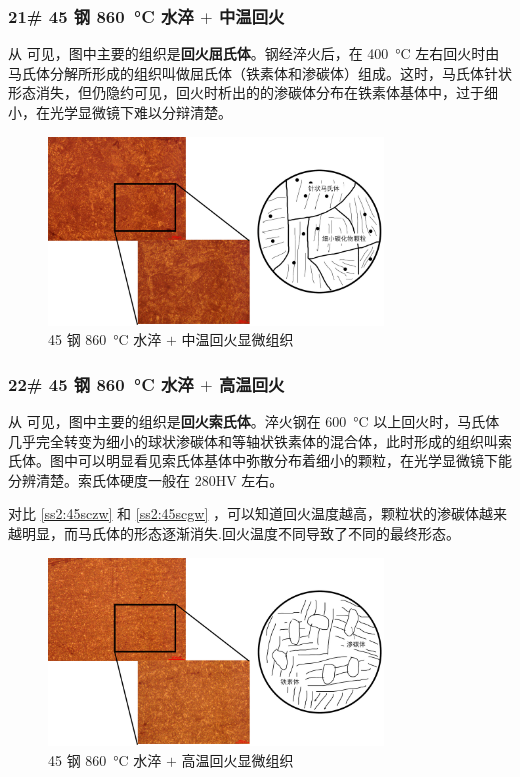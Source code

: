 \documentclass[a4paper,utf8]{article}
\begin{document}
        \subsubsection{21\# 45 钢 \SI{860}{\degreeCelsius} 水淬 $+$ 中温回火\label{ss2:45sczw}}
            从 可见，图中主要的组织是\textbf{回火屈氏体}。钢经淬火后，在 \SI{400}{\degreeCelsius} 左右回火时由马氏体分解所形成的组织叫做屈氏体（铁素体和渗碳体）组成。这时，马氏体针状形态消失，但仍隐约可见，回火时析出的的渗碳体分布在铁素体基体中，过于细小，在光学显微镜下难以分辩清楚。
            \begin{figure}[!ht]
                \includegraphics[height=50mm]{result/8.pdf}
                \caption{45 钢 \SI{860}{\degreeCelsius} 水淬 $+$ 中温回火显微组织\label{fig:8}}
            \end{figure}

        \subsubsection{22\# 45 钢 \SI{860}{\degreeCelsius} 水淬 $+$ 高温回火\label{ss2:45scgw}}
            从 可见，图中主要的组织是\textbf{回火索氏体}。淬火钢在 \SI{600}{\degreeCelsius} 以上回火时，马氏体几乎完全转变为细小的球状渗碳体和等轴状铁素体的混合体，此时形成的组织叫索氏体。图中可以明显看见索氏体基体中弥散分布着细小的颗粒，在光学显微镜下能分辨清楚。索氏体硬度一般在 280HV 左右。\par
            对比 \ref{ss2:45sczw} 和 \ref{ss2:45scgw} ，可以知道回火温度越高，颗粒状的渗碳体越来越明显，而马氏体的形态逐渐消失.回火温度不同导致了不同的最终形态。
            \begin{figure}[!ht]
                \includegraphics[height=50mm]{result/9.pdf}
                \caption{45 钢 \SI{860}{\degreeCelsius} 水淬 $+$ 高温回火显微组织\label{fig:9}}
            \end{figure}
\end{document}
